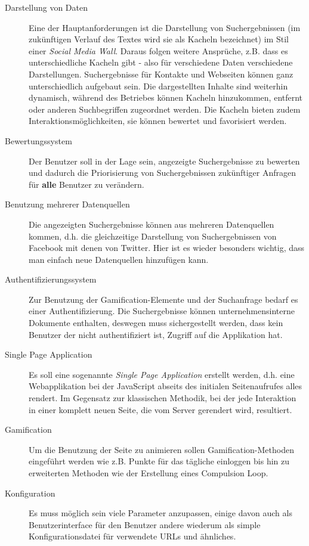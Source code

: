 \documentclass[12pt,twoside]{book}
\begin{document}
\begin{description}

\item[Darstellung von Daten]

Eine der Hauptanforderungen ist die Darstellung von Suchergebnissen (im zukünftigen Verlauf des Textes wird sie als Kacheln bezeichnet) im Stil einer \textit{Social Media Wall}. Daraus folgen weitere Ansprüche, z.B. dass es unterschiedliche Kacheln gibt - also für verschiedene Daten verschiedene Darstellungen. Suchergebnisse für Kontakte und Webseiten können ganz unterschiedlich aufgebaut sein. Die dargestellten Inhalte sind weiterhin dynamisch, während des Betriebes können Kacheln hinzukommen, entfernt oder anderen Suchbegriffen zugeordnet werden. Die Kacheln bieten zudem Interaktionsmöglichkeiten, sie können bewertet und favorisiert werden.

\item[Bewertungssystem]

  Der Benutzer soll in der Lage sein, angezeigte Suchergebnisse zu bewerten und dadurch die Priorisierung von Suchergebnissen zukünftiger Anfragen für \textbf{alle} Benutzer zu verändern.

\item[Benutzung mehrerer Datenquellen]
  Die angezeigten Suchergebnisse können aus mehreren Datenquellen kommen, d.h. die gleichzeitige Darstellung von Suchergebnissen von Facebook mit denen von Twitter. Hier ist es wieder besonders wichtig, dass man einfach neue Datenquellen hinzufügen kann.

\item[Authentifizierungssystem]
	Zur Benutzung der Gamification-Elemente und der Suchanfrage bedarf es einer Authentifizierung. Die Suchergebnisse können unternehmensinterne Dokumente enthalten, deswegen muss sichergestellt werden, dass kein Benutzer der nicht authentifiziert ist, Zugriff auf die Applikation hat.

\item[Single Page Application]
  Es soll eine sogenannte \textit{Single Page Application} erstellt werden, d.h. eine Webapplikation bei der JavaScript abseits des initialen Seitenaufrufes alles rendert. Im Gegensatz zur klassischen Methodik, bei der jede Interaktion in einer komplett neuen Seite, die vom Server gerendert wird, resultiert.

\item[Gamification]
  Um die Benutzung der Seite zu animieren sollen Gamification-Methoden eingeführt werden wie z.B. Punkte für das tägliche einloggen bis hin zu erweiterten Methoden wie der Erstellung eines Compulsion Loop.

\item[Konfiguration]
  Es muss möglich sein viele Parameter anzupassen, einige davon auch als Benutzerinterface für den Benutzer andere wiederum als simple Konfigurationsdatei für verwendete URLs und ähnliches.

\end{description}
\end{document}
